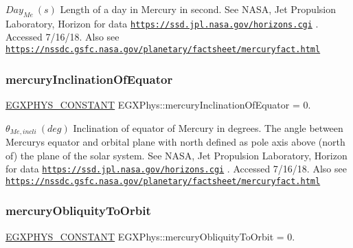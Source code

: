 $ Day_{Me} \ (s)$ Length of a day in Mercury in second. See N\+A\+SA, Jet Propulsion Laboratory, Horizon for data \href{https://ssd.jpl.nasa.gov/horizons.cgi}{\tt https\+://ssd.\+jpl.\+nasa.\+gov/horizons.\+cgi} . Accessed 7/16/18. Also see \href{https://nssdc.gsfc.nasa.gov/planetary/factsheet/mercuryfact.html}{\tt https\+://nssdc.\+gsfc.\+nasa.\+gov/planetary/factsheet/mercuryfact.\+html} \mbox{\label{group___e_g_x_phys-_constants-_astrophysics-_solar_system-_mercury-_orbit_ga691d47f9e6155fde39610f722c2c81b3}} 
\subsubsection{\texorpdfstring{mercury\+Inclination\+Of\+Equator}{mercuryInclinationOfEquator}}
{\footnotesize\ttfamily \mbox{\hyperlink{group___e_g_x_phys-_constants-_macros_ga76980d288494ce1714c9ac68a95ba702}{E\+G\+X\+P\+H\+Y\+S\+\_\+\+C\+O\+N\+S\+T\+A\+NT}} E\+G\+X\+Phys\+::mercury\+Inclination\+Of\+Equator = 0.}

$ \theta_{Me,incli} \ (deg)$ Inclination of equator of Mercury in degrees. The angle between Mercury\textquotesingle{}s equator and orbital plane with north defined as pole axis above (north of) the plane of the solar system. See N\+A\+SA, Jet Propulsion Laboratory, Horizon for data \href{https://ssd.jpl.nasa.gov/horizons.cgi}{\tt https\+://ssd.\+jpl.\+nasa.\+gov/horizons.\+cgi} . Accessed 7/16/18. Also see \href{https://nssdc.gsfc.nasa.gov/planetary/factsheet/mercuryfact.html}{\tt https\+://nssdc.\+gsfc.\+nasa.\+gov/planetary/factsheet/mercuryfact.\+html} \mbox{\label{group___e_g_x_phys-_constants-_astrophysics-_solar_system-_mercury-_orbit_ga9eab31e7775425e9d213174b91d7cb7e}} 
\subsubsection{\texorpdfstring{mercury\+Obliquity\+To\+Orbit}{mercuryObliquityToOrbit}}
{\footnotesize\ttfamily \mbox{\hyperlink{group___e_g_x_phys-_constants-_macros_ga76980d288494ce1714c9ac68a95ba702}{E\+G\+X\+P\+H\+Y\+S\+\_\+\+C\+O\+N\+S\+T\+A\+NT}} E\+G\+X\+Phys\+::mercury\+Obliquity\+To\+Orbit = 0.}

